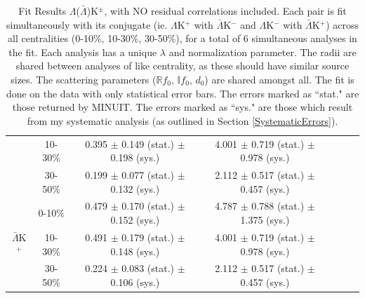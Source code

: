 \documentclass[../AnalysisNoteJBuxton.tex]{subfiles}
\begin{document}
\begin{landscape}
\begin{table}[htbp]
{\begin{tabular}{|c|c|c|c|c|c|c|}
   & 10-30\% & 0.395 $\pm$ 0.149 (stat.) $\pm$ 0.198 (sys.)  %
             & 4.001 $\pm$ 0.719 (stat.) $\pm$ 0.978 (sys.)  %
             & & & \\
             
   & 30-50\% & 0.199 $\pm$ 0.077 (stat.) $\pm$ 0.132 (sys.)  %
             & 2.112 $\pm$ 0.517 (stat.) $\pm$ 0.457 (sys.)  %
             & & & \\
  \cline{1-4}  
  \multirow{3}{*}{$\bar{\Lambda}$K$^{+}$}  
   &  0-10\% & 0.479 $\pm$ 0.170 (stat.) $\pm$ 0.152 (sys.)  %
             & 4.787 $\pm$ 0.788 (stat.) $\pm$ 1.375 (sys.)  %
             & & & \\
             
   & 10-30\% & 0.491 $\pm$ 0.179 (stat.) $\pm$ 0.148 (sys.)  %
             & 4.001 $\pm$ 0.719 (stat.) $\pm$ 0.978 (sys.)  %
             & & & \\
             
   & 30-50\% & 0.224 $\pm$ 0.083 (stat.) $\pm$ 0.106 (sys.)  %
             & 2.112 $\pm$ 0.517 (stat.) $\pm$ 0.457 (sys.)  %
             & & & \\
  \hline
 \end{tabular}}
 \caption{Fit Results $\Lambda$($\bar{\Lambda}$)K$^{\pm}$, with NO residual correlations included.
 Each pair is fit simultaneously with its conjugate (ie. $\Lambda$K$^{+}$ with $\bar{\Lambda}$K$^{-}$ and $\Lambda$K$^{-}$ with $\bar{\Lambda}$K$^{+}$) across all centralities (0-10\%, 10-30\%, 30-50\%), for a total of 6 simultaneous analyses in the fit.
 Each analysis has a unique $\lambda$ and normalization parameter.
 The radii are shared between analyses of like centrality, as these should have similar source sizes.
 The scattering parameters ($\mathbb{R}f_{0}$, $\mathbb{I}f_{0}$, $d_{0}$) are shared amongst all.
 The fit is done on the data with only statistical error bars.
 The errors marked as ``stat." are those returned by MINUIT.
 The errors marked as ``sys." are those which result from my systematic analysis (as outlined in Section \ref{SystematicErrors}).}
 \label{tab:FitResultsLamKch_NoRes}
\end{table}




\end{landscape}
\end{document}
